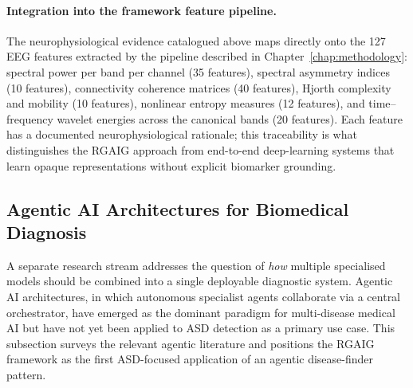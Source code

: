 \paragraph{Integration into the framework feature pipeline.}
The neurophysiological evidence catalogued above maps directly onto the 127 EEG features extracted by the pipeline described in Chapter~\ref{chap:methodology}: spectral power per band per channel (35 features), spectral asymmetry indices (10 features), connectivity coherence matrices (40 features), Hjorth complexity and mobility (10 features), nonlinear entropy measures (12 features), and time--frequency wavelet energies across the canonical bands (20 features). Each feature has a documented neurophysiological rationale; this traceability is what distinguishes the RGAIG approach from end-to-end deep-learning systems that learn opaque representations without explicit biomarker grounding.

\subsection{Agentic AI Architectures for Biomedical Diagnosis}
\label{subsec:agentic_asd}

A separate research stream addresses the question of \emph{how} multiple specialised models should be combined into a single deployable diagnostic system. Agentic AI architectures, in which autonomous specialist agents collaborate via a central orchestrator, have emerged as the dominant paradigm for multi-disease medical AI but have not yet been applied to ASD detection as a primary use case. This subsection surveys the relevant agentic literature and positions the RGAIG framework as the first ASD-focused application of an agentic disease-finder pattern.

